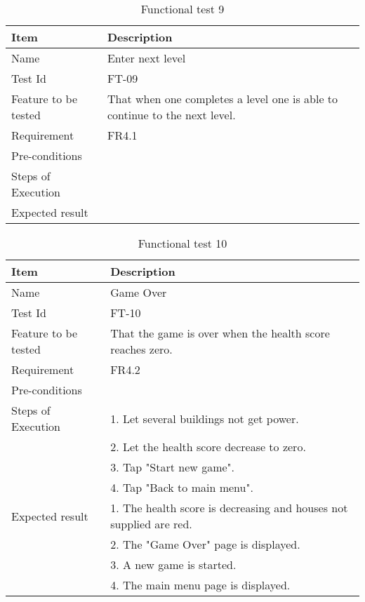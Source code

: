 \begin{table}[H]
\centering
	\begin{tabular}{ l | p{8cm} }
		\hline
		{\bf Item} & {\bf Description} \\ \hline
		Name & Enter next level \\ 
		Test Id & FT-09 \\ 
		Feature to be tested & That when one completes a level one is able to continue to the next level. \\ 
		Requirement & FR4.1 \\ 
		Pre-conditions & \\ 
		Steps of Execution & \\ 
		Expected result & \\ 
	\end{tabular}
	\caption{Functional test 9}
\end{table}

\begin{table}[H]
\centering
	\begin{tabular}{ l | p{8cm} }
		\hline
		{\bf Item} & {\bf Description} \\ \hline
		Name & Game Over \\ 
		Test Id & FT-10 \\ 
		Feature to be tested & That the game is over when the health score reaches zero. \\ 
		Requirement & FR4.2 \\ 
		Pre-conditions & \\ 
		Steps of Execution & 1. Let several buildings not get power. \\ 
		& 2. Let the health score decrease to zero. \\
		& 3. Tap "Start new game". \\
		& 4. Tap "Back to main menu". \\
		Expected result & 1. The health score is decreasing and houses not supplied are red. \\
		& 2. The "Game Over" page is displayed. \\
		& 3. A new game is started. \\
		& 4. The main menu page is displayed. \\
	\end{tabular}
	\caption{Functional test 10}
\end{table}

